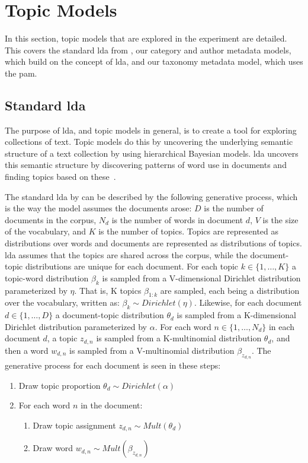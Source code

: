 \section{Topic Models}\label{sec:plate_notation}
In this section, topic models that are explored in the experiment are detailed.
This covers the standard \gls{lda} from \citet{blei2003latent}, our category and author metadata models, which build on the concept of \gls{lda}, and our taxonomy metadata model, which uses the \acrlong{pam}.

\subsection{Standard \gls{lda}}
The purpose of \gls{lda}, and topic models in general, is to create a tool for exploring collections of text.
Topic models do this by uncovering the underlying semantic structure of a text collection by using hierarchical Bayesian models.
\Gls{lda} uncovers this semantic structure by discovering patterns of word use in documents and finding topics based on these~\cite{blei2009topic}.

The standard \gls{lda} by \citet{blei2003latent} can be described by the following generative process, which is the way the model assumes the documents arose:
$D$ is the number of documents in the corpus, $N_d$ is the number of words in document $d$, $V$ is the size of the vocabulary, and $K$ is the number of topics.
Topics are represented as distributions over words and documents are represented as distributions of topics.
\Gls{lda} assumes that the topics are shared across the corpus, while the document-topic distributions are unique for each document.
For each topic $k \in \{1,\dots, K\}$ a topic-word distribution $\beta_k$ is sampled from a V-dimensional Dirichlet distribution parameterized by $\eta$.
That is, K topics $\beta_{1:k}$ are sampled, each being a distribution over the vocabulary, written as: $\beta_k \sim Dirichlet(\eta)$.
Likewise, for each document $d \in \{1,\dots, D\}$ a document-topic distribution $\theta_d$ is sampled from a K-dimensional Dirichlet distribution parameterized by $\alpha$.
For each word $n \in \{1, \dots, N_d\}$ in each document $d$, a topic $z_{d,n}$ is sampled from a K-multinomial distribution $\theta_d$, and then a word $w_{d,n}$ is sampled from a V-multinomial distribution $\beta_{z_{d,n}}$.
The generative process for each document is seen in these steps:

\vspace{\topsep}
\begin{enumerate}
	\item Draw topic proportion $\theta_d \sim Dirichlet(\alpha)$
	\item For each word $n$ in the document:
	\begin{enumerate}
		\item Draw topic assignment $z_{d,n} \sim Mult(\theta_d)$
		\item Draw word $w_{d,n} \sim Mult(\beta_{z_{d,n}})$
	\end{enumerate}
\end{enumerate}
\vspace{\topsep}

